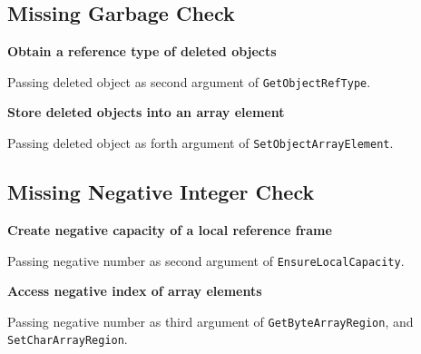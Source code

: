 \documentclass[10pt]{article}
\begin{document}
\subsection{Missing Garbage Check}
\vspace{3mm}
\noindent \textbf{Obtain a reference type of deleted objects}

Passing deleted object as second argument of {\tt GetObjectRefType}.

\vspace{3mm}
\noindent \textbf{Store deleted objects into an array element}

Passing deleted object as forth argument of {\tt SetObjectArrayElement}.


\subsection{Missing Negative Integer Check}

\vspace{3mm}
\noindent \textbf{Create negative capacity of a local reference frame}

Passing negative number as second argument of {\tt EnsureLocalCapacity}.

\vspace{3mm}
\noindent \textbf{Access negative index of array elements}

Passing negative number as third argument of {\tt GetByteArrayRegion}, and {\tt SetCharArrayRegion}.
\end{document}
